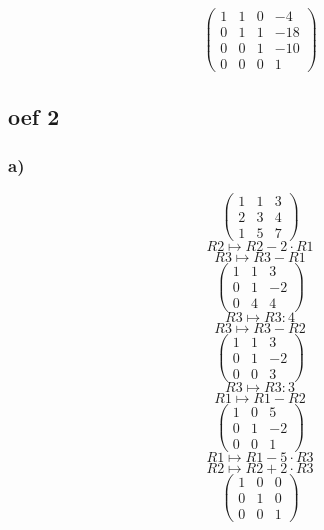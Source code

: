 \documentclass[lineaire_algebra_oplossingen.tex]{subfiles}
\begin{document}
$$
\begin{pmatrix}
1 & 1 & 0 & -4\\
0 & 1 & 1 & -18\\
0 & 0 & 1 & -10\\
0 & 0 & 0 & 1
\end{pmatrix}
$$
\subsection{oef 2}
\subsubsection*{a)}
\[
\begin{pmatrix}
1 &  1 &  3\\
2 &  3 &  4\\
1 &  5 &  7
\end{pmatrix}
\]
\[ R2 \longmapsto R2 -2\cdot R1\]
\[ R3 \longmapsto R3 - R1\]
\[
\begin{pmatrix}
1 &  1 &  3\\
0 &  1 &  -2\\
0 &  4 &  4
\end{pmatrix}
\]
\[ R3 \longmapsto R3:4\]
\[ R3 \longmapsto R3 - R2\]
\[
\begin{pmatrix}
1 &  1 &  3\\
0 &  1 &  -2\\
0 &  0 &  3
\end{pmatrix}
\]
\[ R3 \longmapsto R3:3\]
\[ R1 \longmapsto R1 - R2\]
\[
\begin{pmatrix}
1 &  0 &  5\\
0 &  1 &  -2\\
0 &  0 &  1
\end{pmatrix}
\]
\[ R1 \longmapsto R1 -5\cdot R3\]
\[ R2 \longmapsto R2 +2\cdot R3\]
\[
\begin{pmatrix}
1 &  0 &  0\\
0 &  1 &  0\\
0 &  0 &  1
\end{pmatrix}
\]
\end{document}
